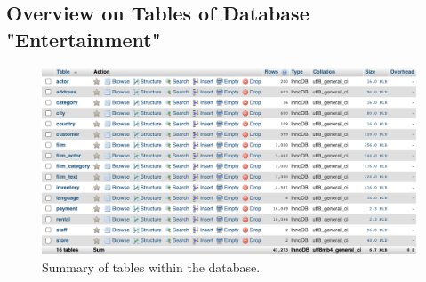 \documentclass[openany]{article}
\begin{document}
\subsection{Overview on Tables of Database "Entertainment"}
	\begin{figure}[H]
		\includegraphics[width=\textwidth]{table_overview}
		\caption{Summary of tables within the database.}
	\end{figure}	
	
\end{document}
